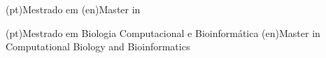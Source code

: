 \ntdegreename(pt){Mestrado em }
\ntdegreename(en){Master in }




\ntdegreename(pt){Mestrado em Biologia Computacional e Bioinformática}
\ntdegreename(en){Master in Computational Biology and Bioinformatics}













